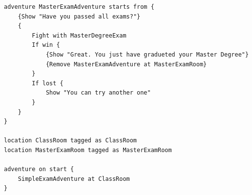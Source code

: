 \documentclass	{xmgr}
\begin{document}
\begin{lstlisting}
adventure MasterExamAdventure starts from {
	{Show "Have you passed all exams?"}
	{
		Fight with MasterDegreeExam
		If win {
			{Show "Great. You just have gradueted your Master Degree"}
			{Remove MasterExamAdventure at MasterExamRoom}
		}
		If lost {
			Show "You can try another one"
		}
	}
}

location ClassRoom tagged as ClassRoom
location MasterExamRoom tagged as MasterExamRoom

adventure on start {
	SimpleExamAdventure at ClassRoom
}

\end{lstlisting}




\listoftables

\listoffigures

\oswiadczenie
\end{document}
